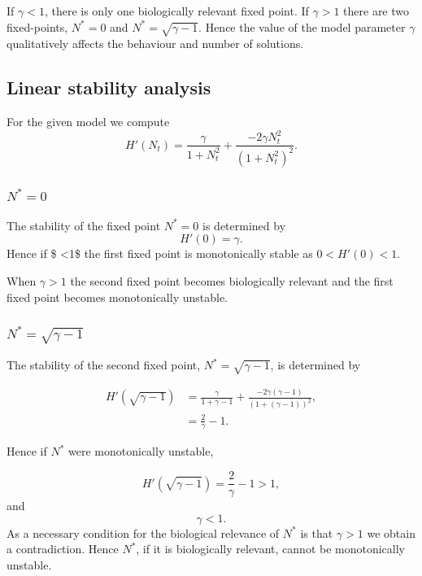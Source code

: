 \documentclass[
  letterpaper,
  DIV=11,
  numbers=noendperiod]{scrreprt}
\begin{document}
If \(\gamma<1\), there is only one biologically relevant fixed point. If
\(\gamma >1\) there are two fixed-points, \(N^*=0\) and
\(N^*=\sqrt{\gamma-1}\). Hence the value of the model parameter
\(\gamma\) qualitatively affects the behaviour and number of solutions.

\hypertarget{linear-stability-analysis}{%
\subsection{Linear stability analysis}\label{linear-stability-analysis}}

For the given model we compute \[
H'(N_t)= \frac{\gamma}{1+N_t^2} + \frac{-2 \gamma N_t^2}{(1+N_t^2)^2}.
\]

\hypertarget{n0}{%
\subsubsection{\texorpdfstring{\(N^*=0\)}{N\^{}*=0}}\label{n0}}

The stability of the fixed point \(N^*=0\) is determined by \[
H'(0)= \gamma.
\] Hence if \$ \gamma \textless1\$ the first fixed point is
monotonically stable as \(0<H'(0) < 1\).

When \(\gamma > 1\) the second fixed point becomes biologically relevant
and the first fixed point becomes monotonically unstable.

\hypertarget{nsqrtgamma-1}{%
\subsubsection{\texorpdfstring{\(N^*=\sqrt{\gamma-1}\)}{N\^{}*=\textbackslash sqrt\{\textbackslash gamma-1\}}}\label{nsqrtgamma-1}}

The stability of the second fixed point, \(N^*=\sqrt{\gamma-1}\), is
determined by

\[
\begin{aligned}
H'(\sqrt{\gamma-1})&= \frac{\gamma}{1+\gamma-1} + \frac{-2 \gamma (\gamma-1)}{(1+(\gamma-1))^2}, \\
&= \frac{2}{\gamma}-1.
\end{aligned}
\]

Hence if \(N^*\) were monotonically unstable,

\[
H'(\sqrt{\gamma-1}) = \frac{2}{\gamma}-1 >1,
\] and \[
\gamma<1.
\] As a necessary condition for the biological relevance of \(N^*\) is
that \(\gamma>1\) we obtain a contradiction. Hence \(N^*\), if it is
biologically relevant, cannot be monotonically unstable.
\end{document}
